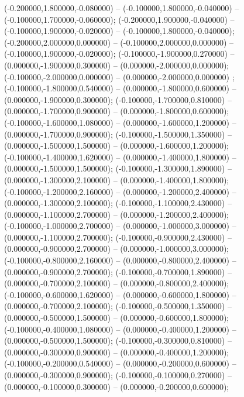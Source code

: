  (-0.200000,1.800000,-0.080000) -- (-0.100000,1.800000,-0.040000) -- (-0.100000,1.700000,-0.060000);
 (-0.200000,1.900000,-0.040000) -- (-0.100000,1.900000,-0.020000) -- (-0.100000,1.800000,-0.040000);
 (-0.200000,2.000000,0.000000) -- (-0.100000,2.000000,0.000000) -- (-0.100000,1.900000,-0.020000);
 (-0.100000,-1.900000,0.270000) -- (0.000000,-1.900000,0.300000) -- (0.000000,-2.000000,0.000000);
 (-0.100000,-2.000000,0.000000) -- (0.000000,-2.000000,0.000000) ;
 (-0.100000,-1.800000,0.540000) -- (0.000000,-1.800000,0.600000) -- (0.000000,-1.900000,0.300000);
 (-0.100000,-1.700000,0.810000) -- (0.000000,-1.700000,0.900000) -- (0.000000,-1.800000,0.600000);
 (-0.100000,-1.600000,1.080000) -- (0.000000,-1.600000,1.200000) -- (0.000000,-1.700000,0.900000);
 (-0.100000,-1.500000,1.350000) -- (0.000000,-1.500000,1.500000) -- (0.000000,-1.600000,1.200000);
 (-0.100000,-1.400000,1.620000) -- (0.000000,-1.400000,1.800000) -- (0.000000,-1.500000,1.500000);
 (-0.100000,-1.300000,1.890000) -- (0.000000,-1.300000,2.100000) -- (0.000000,-1.400000,1.800000);
 (-0.100000,-1.200000,2.160000) -- (0.000000,-1.200000,2.400000) -- (0.000000,-1.300000,2.100000);
 (-0.100000,-1.100000,2.430000) -- (0.000000,-1.100000,2.700000) -- (0.000000,-1.200000,2.400000);
 (-0.100000,-1.000000,2.700000) -- (0.000000,-1.000000,3.000000) -- (0.000000,-1.100000,2.700000);
 (-0.100000,-0.900000,2.430000) -- (0.000000,-0.900000,2.700000) -- (0.000000,-1.000000,3.000000);
 (-0.100000,-0.800000,2.160000) -- (0.000000,-0.800000,2.400000) -- (0.000000,-0.900000,2.700000);
 (-0.100000,-0.700000,1.890000) -- (0.000000,-0.700000,2.100000) -- (0.000000,-0.800000,2.400000);
 (-0.100000,-0.600000,1.620000) -- (0.000000,-0.600000,1.800000) -- (0.000000,-0.700000,2.100000);
 (-0.100000,-0.500000,1.350000) -- (0.000000,-0.500000,1.500000) -- (0.000000,-0.600000,1.800000);
 (-0.100000,-0.400000,1.080000) -- (0.000000,-0.400000,1.200000) -- (0.000000,-0.500000,1.500000);
 (-0.100000,-0.300000,0.810000) -- (0.000000,-0.300000,0.900000) -- (0.000000,-0.400000,1.200000);
 (-0.100000,-0.200000,0.540000) -- (0.000000,-0.200000,0.600000) -- (0.000000,-0.300000,0.900000);
 (-0.100000,-0.100000,0.270000) -- (0.000000,-0.100000,0.300000) -- (0.000000,-0.200000,0.600000);
